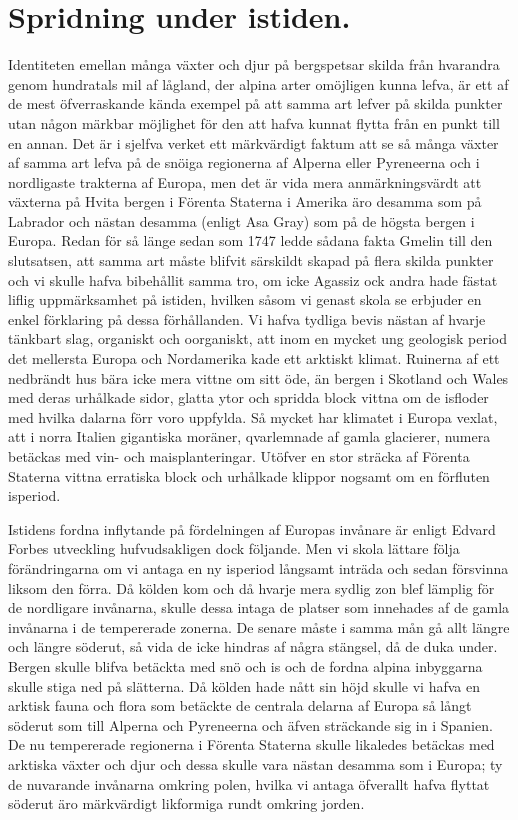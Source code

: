 \section{Spridning under istiden.}

Identiteten emellan många växter och djur på bergspetsar skilda från hvarandra genom hundratals mil af lågland, der alpina arter omöjligen kunna lefva, är ett af de mest öfverraskande kända exempel på att samma art lefver på skilda punkter utan någon märkbar möjlighet för den att hafva kunnat flytta från en punkt till en annan. Det är i sjelfva verket ett märkvärdigt faktum att se så många växter af samma art lefva på de snöiga regionerna af Alperna eller Pyreneerna och i nordligaste trakterna af Europa, men det är vida mera anmärkningsvärdt att växterna på Hvita bergen i Förenta Staterna i Amerika äro desamma som på Labrador och nästan desamma (enligt Asa Gray) som på de högsta bergen i Europa. Redan för så länge sedan som 1747 ledde sådana fakta Gmelin till den slutsatsen, att samma art måste blifvit särskildt skapad på flera skilda punkter och vi skulle hafva bibehållit samma tro, om icke Agassiz ock andra hade fästat liflig uppmärksamhet på istiden, hvilken såsom vi genast skola se erbjuder en enkel förklaring på dessa förhållanden. Vi hafva tydliga bevis nästan af hvarje tänkbart slag, organiskt och oorganiskt, att inom en mycket ung geologisk period det mellersta Europa och Nordamerika kade ett arktiskt klimat. Ruinerna af ett nedbrändt hus bära icke mera vittne om sitt öde, än bergen i Skotland och Wales med deras urhålkade sidor, glatta ytor och spridda block vittna om de isfloder med hvilka dalarna förr voro uppfylda. Så mycket har klimatet i Europa vexlat, att i norra Italien gigantiska moräner, qvarlemnade af gamla glacierer, numera betäckas med vin- och maisplanteringar. Utöfver en stor sträcka af Förenta Staterna vittna erratiska block och urhålkade klippor nogsamt om en förfluten isperiod.

Istidens fordna inflytande på fördelningen af Europas invånare är enligt Edvard Forbes utveckling hufvudsakligen dock följande. Men vi skola lättare följa förändringarna om vi antaga en ny isperiod långsamt inträda och sedan försvinna liksom den förra. Då kölden kom och då hvarje mera sydlig zon blef lämplig för de nordligare invånarna, skulle dessa intaga de platser som innehades af de gamla invånarna i de tempererade zonerna. De senare måste i samma mån gå allt längre och längre söderut, så vida de icke hindras af några stängsel, då de duka under. Bergen skulle blifva betäckta med snö och is och de fordna alpina inbyggarna skulle stiga ned på slätterna. Då kölden hade nått sin höjd skulle vi hafva en arktisk fauna och flora som betäckte de centrala delarna af Europa så långt söderut som till Alperna och Pyreneerna och äfven sträckande sig in i Spanien. De nu tempererade regionerna i Förenta Staterna skulle likaledes betäckas med arktiska växter och djur och dessa skulle vara nästan desamma som i Europa; ty de nuvarande invånarna omkring polen, hvilka vi antaga öfverallt hafva flyttat söderut äro märkvärdigt likformiga rundt omkring jorden.

